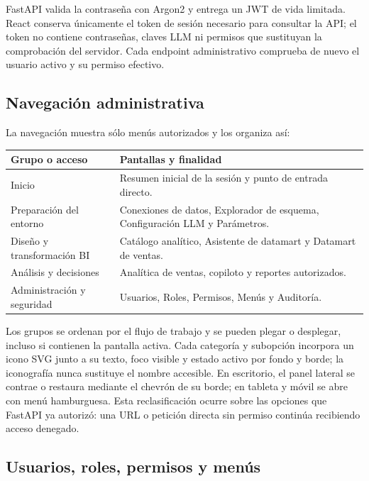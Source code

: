 \documentclass[11pt,letterpaper]{article}
\begin{document}
FastAPI valida la contraseña con Argon2 y entrega un JWT de vida limitada. React conserva únicamente el token de sesión necesario para consultar la API; el token no contiene contraseñas, claves LLM ni permisos que sustituyan la comprobación del servidor. Cada endpoint administrativo comprueba de nuevo el usuario activo y su permiso efectivo.

\subsection{Navegación administrativa}

La navegación muestra sólo menús autorizados y los organiza así:

\begin{center}
\begin{tabularx}{0.88\textwidth}{@{}l X@{}}
  \toprule
  Grupo o acceso & Pantallas y finalidad \\
  \midrule
  Inicio & Resumen inicial de la sesión y punto de entrada directo. \\
  Preparación del entorno & Conexiones de datos, Explorador de esquema, Configuración LLM y Parámetros. \\
  Diseño y transformación BI & Catálogo analítico, Asistente de datamart y Datamart de ventas. \\
  Análisis y decisiones & Analítica de ventas, copiloto y reportes autorizados. \\
  Administración y seguridad & Usuarios, Roles, Permisos, Menús y Auditoría. \\
  \bottomrule
\end{tabularx}
\end{center}

Los grupos se ordenan por el flujo de trabajo y se pueden plegar o desplegar, incluso si contienen la pantalla activa. Cada categoría y subopción incorpora un icono SVG junto a su texto, foco visible y estado activo por fondo y borde; la iconografía nunca sustituye el nombre accesible. En escritorio, el panel lateral se contrae o restaura mediante el chevrón de su borde; en tableta y móvil se abre con menú hamburguesa. Esta reclasificación ocurre sobre las opciones que FastAPI ya autorizó: una URL o petición directa sin permiso continúa recibiendo acceso denegado.

\subsection{Usuarios, roles, permisos y menús}
\end{document}
